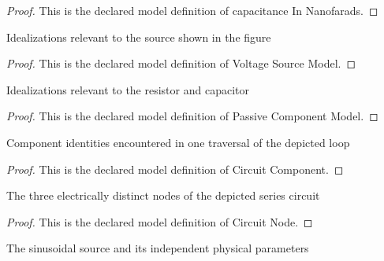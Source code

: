 \begin{proof}
  This is the declared model definition of capacitance In Nanofarads.
\end{proof}
\begin{definition}
  \label{def:physics:phyx-mini-0887:phyxminiproblems-problemphyxmini0887-voltagesourcemodel}
  Idealizations relevant to the source shown in the figure
\end{definition}
\begin{proof}
  This is the declared model definition of Voltage Source Model.
\end{proof}
\begin{definition}
  \label{def:physics:phyx-mini-0887:phyxminiproblems-problemphyxmini0887-passivecomponentmodel}
  Idealizations relevant to the resistor and capacitor
\end{definition}
\begin{proof}
  This is the declared model definition of Passive Component Model.
\end{proof}
\begin{definition}
  \label{def:physics:phyx-mini-0887:phyxminiproblems-problemphyxmini0887-circuitcomponent}
  Component identities encountered in one traversal of the depicted loop
\end{definition}
\begin{proof}
  This is the declared model definition of Circuit Component.
\end{proof}
\begin{definition}
  \label{def:physics:phyx-mini-0887:phyxminiproblems-problemphyxmini0887-circuitnode}
  The three electrically distinct nodes of the depicted series circuit
\end{definition}
\begin{proof}
  This is the declared model definition of Circuit Node.
\end{proof}
\begin{definition}
  \label{def:physics:phyx-mini-0887:phyxminiproblems-problemphyxmini0887-sinusoidalvoltagesource}
  The sinusoidal source and its independent physical parameters
\end{definition}
